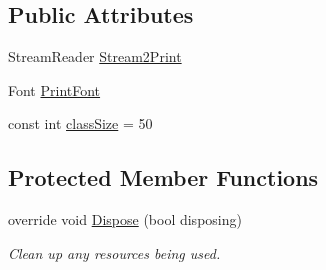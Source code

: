 \subsection*{\-Public \-Attributes}
\begin{DoxyCompactItemize}
\item 
\-Stream\-Reader \hyperlink{class_sr_p___classroom_inq_1_1frm_classrrom_inq_aa030f46a7915eae3a0b8b88661be51a8}{\-Stream2\-Print}
\item 
\-Font \hyperlink{class_sr_p___classroom_inq_1_1frm_classrrom_inq_a314e4a61ea8458c5198273335dcf0b5f}{\-Print\-Font}
\item 
const int \hyperlink{class_sr_p___classroom_inq_1_1frm_classrrom_inq_a78d9aab335edfe53d39036b9d89928a8}{class\-Size} = 50
\end{DoxyCompactItemize}
\subsection*{\-Protected \-Member \-Functions}
\begin{DoxyCompactItemize}
\item 
override void \hyperlink{class_sr_p___classroom_inq_1_1frm_classrrom_inq_a7e6095e2ed04a53088833156d8d205b1}{\-Dispose} (bool disposing)
\begin{DoxyCompactList}\small\item\em \-Clean up any resources being used. \end{DoxyCompactList}\end{DoxyCompactItemize}
